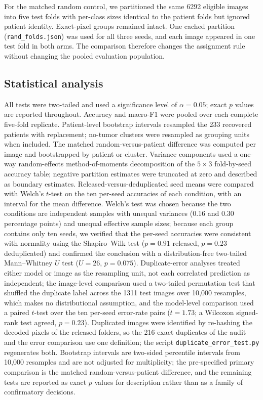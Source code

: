 ﻿\documentclass[11pt]{article}
\begin{document}
For the matched random control, we partitioned the same 6292 eligible images into five test folds with per-class sizes identical to the patient folds but ignored patient identity. Exact-pixel groups remained intact. One cached partition (\texttt{rand\_folds.json}) was used for all three seeds, and each image appeared in one test fold in both arms. The comparison therefore changes the assignment rule without changing the pooled evaluation population.

\subsection{Statistical analysis}
All tests were two-tailed and used a significance level of $\alpha=0.05$; exact $p$ values are reported throughout. Accuracy and macro-F1 were pooled over each complete five-fold replicate. Patient-level bootstrap intervals resampled the 233 recovered patients with replacement; no-tumor clusters were resampled as grouping units when included. The matched random-versus-patient difference was computed per image and bootstrapped by patient or cluster. Variance components used a one-way random-effects method-of-moments decomposition of the $5\times3$ fold-by-seed accuracy table; negative partition estimates were truncated at zero and described as boundary estimates. Released-versus-deduplicated seed means were compared with Welch's $t$-test on the ten per-seed accuracies of each condition, with an interval for the mean difference. Welch's test was chosen because the two conditions are independent samples with unequal variances (0.16 and 0.30 percentage points) and unequal effective sample sizes; because each group contains only ten seeds, we verified that the per-seed accuracies were consistent with normality using the Shapiro--Wilk test ($p=0.91$ released, $p=0.23$ deduplicated) and confirmed the conclusion with a distribution-free two-tailed Mann--Whitney $U$ test ($U=26$, $p=0.075$). Duplicate-error analyses treated either model or image as the resampling unit, not each correlated prediction as independent; the image-level comparison used a two-tailed permutation test that shuffled the duplicate label across the 1311 test images over 10,000 resamples, which makes no distributional assumption, and the model-level comparison used a paired $t$-test over the ten per-seed error-rate pairs ($t=1.73$; a Wilcoxon signed-rank test agreed, $p=0.23$). Duplicated images were identified by re-hashing the decoded pixels of the released folders, so the 216 exact duplicates of the audit and the error comparison use one definition; the script \texttt{duplicate\_error\_test.py} regenerates both. Bootstrap intervals are two-sided percentile intervals from 10,000 resamples and are not adjusted for multiplicity; the pre-specified primary comparison is the matched random-versus-patient difference, and the remaining tests are reported as exact $p$ values for description rather than as a family of confirmatory decisions.
\end{document}
